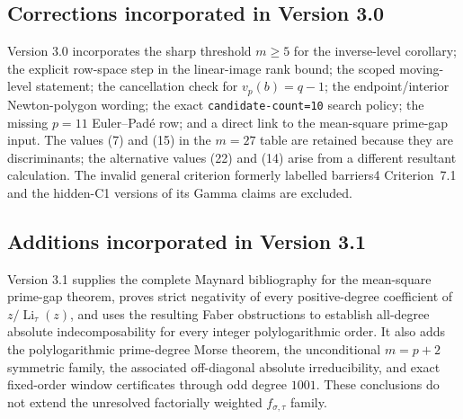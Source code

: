 \subsection{Corrections incorporated in Version 3.0}

Version 3.0 incorporates the sharp threshold \(m\ge5\) for the inverse-level
corollary; the explicit row-space step in the linear-image rank bound; the
scoped moving-level statement; the cancellation check for
\(v_p(b)=q-1\); the endpoint/interior Newton-polygon wording; the exact
\texttt{candidate-count=10} search policy; the missing \(p=11\) Euler--Pad\'e
row; and a direct link to the mean-square prime-gap input.  The values (7)
and (15) in the \(m=27\) table are retained because they are discriminants;
the alternative values (22) and (14) arise from a different resultant
calculation.  The invalid general criterion formerly labelled barriers4
Criterion~7.1 and the hidden-C1 versions of its Gamma claims are excluded.

\subsection{Additions incorporated in Version 3.1}

Version 3.1 supplies the complete Maynard bibliography for the mean-square
prime-gap theorem, proves strict negativity of every positive-degree
coefficient of \(z/\operatorname{Li}_\tau(z)\), and uses the resulting Faber
obstructions to establish all-degree absolute indecomposability for every
integer polylogarithmic order.  It also adds the polylogarithmic prime-degree
Morse theorem, the unconditional \(m=p+2\) symmetric family, the associated
off-diagonal absolute irreducibility, and exact fixed-order window
certificates through odd degree \(1001\).  These conclusions do not extend
the unresolved factorially weighted \(f_{\sigma,\tau}\) family.
